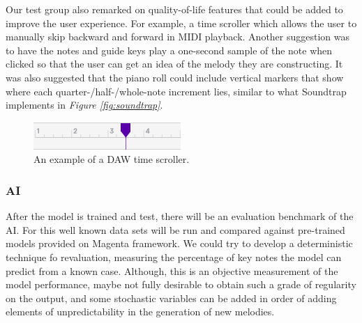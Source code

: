 Our test group also remarked on quality-of-life features that could be added to improve the user
experience. For example, a time scroller which allows the user to manually skip backward and
forward in MIDI playback. Another suggestion was to have the notes and guide keys play a
one-second sample of the note when clicked so that the user can get an idea of the melody they
are constructing. It was also suggested that the piano roll could include vertical markers that
show where each quarter-/half-/whole-note increment lies, similar to what Soundtrap implements in
\textit{Figure \ref{fig:soundtrap}}.

\begin{figure}[h!]
  \centering
  \includegraphics{image/Scroller.png}
  \caption{An example of a DAW time scroller.}
  \label{fig:scroller}
\end{figure}

\subsubsection{AI}

After the model is trained and test, there will be an evaluation benchmark of the AI. For
this well known data sets will be run and compared against pre-trained models provided on
Magenta framework. We could try to develop a deterministic technique fo revaluation,
measuring the percentage of key notes the model can predict from a known case. Although,
this is an objective measurement of the model performance, maybe not fully desirable to
obtain such a grade of regularity on the output, and some stochastic variables can be
added in order of adding elements of unpredictability in the generation of new melodies.
